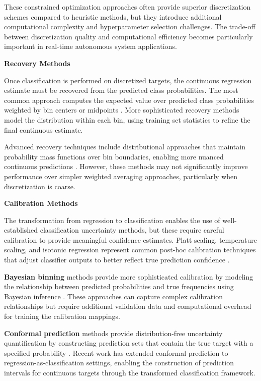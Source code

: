 These constrained optimization approaches often provide superior discretization schemes compared to heuristic methods, but they introduce additional computational complexity and hyperparameter selection challenges. The trade-off between discretization quality and computational efficiency becomes particularly important in real-time autonomous system applications.

\textbf{Recovery Methods}

Once classification is performed on discretized targets, the continuous regression estimate must be recovered from the predicted class probabilities. The most common approach computes the expected value over predicted class probabilities weighted by bin centers or midpoints \cite{barkov2024efficient, keren2018calibrated}. More sophisticated recovery methods model the distribution within each bin, using training set statistics to refine the final continuous estimate.

Advanced recovery techniques include distributional approaches that maintain probability mass functions over bin boundaries, enabling more nuanced continuous predictions \cite{keren2018calibrated}. However, these methods may not significantly improve performance over simpler weighted averaging approaches, particularly when discretization is coarse.


\textbf{Calibration Methods}

The transformation from regression to classification enables the use of well-established classification uncertainty methods, but these require careful calibration to provide meaningful confidence estimates. Platt scaling, temperature scaling, and isotonic regression represent common post-hoc calibration techniques that adjust classifier outputs to better reflect true prediction confidence \cite{keren2018calibrated}.

\textbf{Bayesian binning} methods provide more sophisticated calibration by modeling the relationship between predicted probabilities and true frequencies using Bayesian inference \cite{huang2022mbct}. These approaches can capture complex calibration relationships but require additional validation data and computational overhead for training the calibration mappings.

\textbf{Conformal prediction} methods provide distribution-free uncertainty quantification by constructing prediction sets that contain the true target with a specified probability \cite{guha2024conformal}. Recent work has extended conformal prediction to regression-as-classification settings, enabling the construction of prediction intervals for continuous targets through the transformed classification framework.

